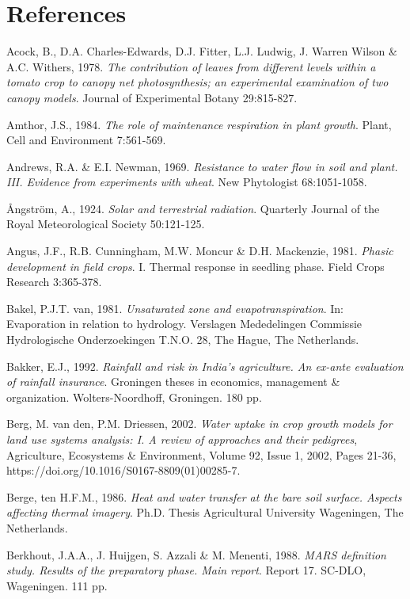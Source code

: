 \chapter{References}

Acock, B., D.A. Charles-Edwards, D.J. Fitter, L.J. Ludwig, J. Warren Wilson \& A.C.
Withers, 1978. {\it The contribution of leaves from different levels within a tomato crop to
canopy net photosynthesis; an experimental examination of two canopy models\/}. Journal of
Experimental Botany 29:815-827.

Amthor, J.S., 1984. {\it The role of maintenance respiration in plant growth\/}. Plant, Cell and
Environment 7:561-569. 

Andrews, R.A. \& E.I. Newman, 1969. {\it Resistance to water flow in soil and plant. III.
Evidence from experiments with wheat\/}. New Phytologist 68:1051-1058.

\AA ngstr\"{o}m, A., 1924. {\it Solar and terrestrial radiation\/}. Quarterly Journal of the Royal
Meteorological Society 50:121-125.

Angus, J.F., R.B. Cunningham, M.W. Moncur \& D.H. Mackenzie, 1981. {\it Phasic
development in field crops\/}. I. Thermal response in seedling phase. Field Crops Research
3:365-378.

Bakel, P.J.T. van, 1981. {\it Unsaturated zone and evapotranspiration\/}. In: Evaporation in
relation to hydrology. Verslagen Mededelingen Commissie Hydrologische Onderzoekingen
T.N.O. 28, The Hague, The Netherlands.

Bakker, E.J., 1992. {\it Rainfall and risk in India's agriculture. An ex-ante evaluation of rainfall
insurance\/}. Groningen theses in economics, management \& organization. Wolters-Noordhoff,
Groningen. 180 pp.

Berg, M. van den, P.M. Driessen, 2002. {\it Water uptake in crop growth models for land use systems analysis: I. A review of approaches and their pedigrees}, Agriculture, Ecosystems \& Environment, Volume 92, Issue 1, 2002, Pages 21-36, https://doi.org/10.1016/S0167-8809(01)00285-7.

Berge, ten H.F.M., 1986. {\it Heat and water transfer at the bare soil surface. Aspects affecting
thermal imagery\/}. Ph.D. Thesis Agricultural University Wageningen, The Netherlands.

Berkhout, J.A.A., J. Huijgen, S. Azzali \& M. Menenti, 1988. {\it MARS definition study.
Results of the preparatory phase. Main report\/}. Report 17. SC-DLO, Wageningen. 111 pp.

